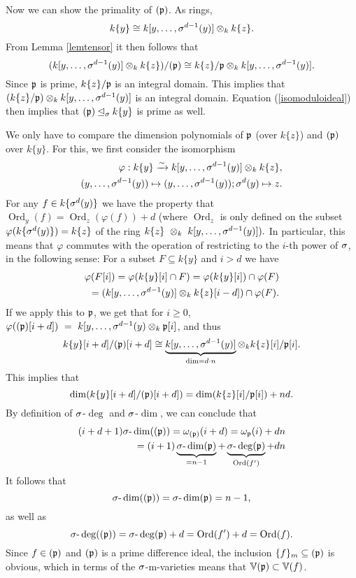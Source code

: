 \begin{theorem}
\begin{bew}
Now we can show the primality of $(\mathfrak{p})$. As rings, $$k\{y\} \cong k[y,\ldots,\sigma^{d-1}(y)] \otimes_k k\{z\}.$$
From Lemma \ref{lemtensor} it then follows that 
\begin{equation}\label{isomoduloideal} (k[y,\ldots,\sigma^{d-1}(y)] \otimes_k k\{z\}) / (\mathfrak{p}) \cong k\{z\} / \mathfrak{p} \otimes_k k[y,\ldots,\sigma^{d-1}(y)]. \end{equation}
Since $\mathfrak{p}$ is prime, $k\{z\}/\mathfrak{p}$ is an integral domain. This implies that $(k\{z\}/\mathfrak{p}) \otimes_k k[y,\ldots,\sigma^{d-1}(y)]$ is an integral domain.
Equation (\ref{isomoduloideal}) then implies that $(\mathfrak{p}) \unlhd_{\sigma} k\{y\}$ is prime as well. 

We only have to compare the dimension polynomials of $\mathfrak{p}$ (over $k\{z\}$) and $(\mathfrak{p})$ over $k\{y\}$.
For this, we first consider the isomorphism
\begin{align*} \varphi: k\{y\} \xrightarrow{\sim} k[y,\ldots,\sigma^{d-1}(y)] \otimes_k k\{z\}, \\ (y,\ldots,\sigma^{d-1}(y)) \mapsto (y,\ldots,\sigma^{d-1}(y)); \sigma^d(y) \mapsto z. \end{align*}
For any $f \in k\{\sigma^{d}(y)\}$ we have the property that $\operatorname{Ord}_y(f) = \operatorname{Ord}_z(\varphi(f)) + d$ (where $\operatorname{Ord}_z$ is only defined on the subset $\varphi(k\{\sigma^d(y)\}) = k\{z\}$ of the ring $k\{z\}~\otimes_k~k[y,\ldots,\sigma^{d-1}(y)]).$
In particular, this means that $\varphi$ commutes with the operation of restricting to the $i$-th power of $\sigma$, in the following sense:
For a subset $F \subseteq k\{y\}$ and $i > d$ we have
\begin{align*} \varphi(F[i]) = \varphi(k\{y\}[i] \cap F) = \varphi(k\{y\}[i]) \cap \varphi(F) \\
 = (k[y,\ldots,\sigma^{d-1}(y)] \otimes_k k\{z\}[i-d]) \cap \varphi(F) .\end{align*}
If we apply this to $\mathfrak{p}$, we get that for $i\geq 0$, $\varphi((\mathfrak{p})[i+d])~=~k[y,\ldots,\sigma^{d-1}(y)\otimes_k\mathfrak{p}[i]$, and thus 
$$ k\{y\}[i+d]/(\mathfrak{p})[i+d] \cong \underbrace{k[y,\ldots,\sigma^{d-1}(y)]}_{ \text{dim} = d \cdot n} \otimes_k k\{z\}[i]/\mathfrak{p}[i].$$
This implies that 
$$\operatorname{dim}(k\{y\}[i+d]/(\mathfrak{p})[i+d]) = \operatorname{dim}(k\{z\}[i]/\mathfrak{p}[i]) + nd.$$
By definition of $\sigma$-$\operatorname{deg}$ and $\sigma$-$\operatorname{dim}$, we can conclude that 
\begin{align*}
(i+d+1) \sigma\text{-}\operatorname{dim}( (\mathfrak{p}) ) = \omega_{(\mathfrak{p})}(i+d) = \omega_{\mathfrak{p}}(i) + dn \\
= (i+1) \underbrace{\sigma\text{-}\operatorname{dim}(\mathfrak{p})}_{ = n - 1} + \underbrace{\sigma\text{-}\operatorname{deg}(\mathfrak{p})}_{\operatorname{Ord}(f')} + dn
\end{align*}
It follows that 
$$\sigma\text{-}\operatorname{dim}((\mathfrak{p}))= \sigma\text{-}\operatorname{dim}(\mathfrak{p}) = n-1, $$
as well as
$$\sigma\text{-}\operatorname{deg}((\mathfrak{p}))= \sigma\text{-}\operatorname{deg}(\mathfrak{p}) + d = \operatorname{Ord}(f') + d = \operatorname{Ord}(f).$$
Since $f \in (\mathfrak{p})$ and $(\mathfrak{p})$ is a prime difference ideal, the inclusion $\{f\}_m \subseteq (\mathfrak{p})$ is obvious, which in terms of the $\sigma$-m-varieties means that $\mathbb{V}(\mathfrak{p}) \subset \mathbb{V}(f)$. 


\end{bew}
\end{theorem}

